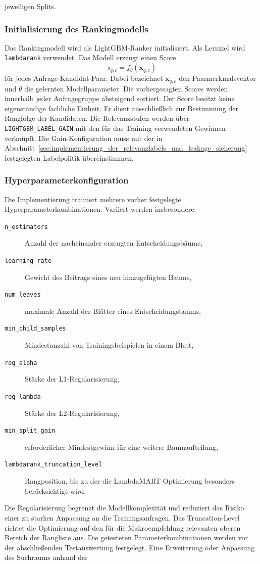 jeweiligen Splits. \subsubsection{Initialisierung des Rankingmodells} \label{subsubsec:initialisierung_rankingmodell} Das Rankingmodell wird als LightGBM-Ranker initialisiert. Als Lernziel wird \texttt{lambdarank} verwendet. Das Modell erzeugt einen Score \begin{equation} s_{q,c} = f_{\theta} \left( \boldsymbol{x}_{q,c} \right) \label{eq:lambdamart_score} \end{equation} für jedes Anfrage-Kandidat-Paar. Dabei bezeichnet $\boldsymbol{x}_{q,c}$ den Paarmerkmalsvektor und $\theta$ die gelernten Modellparameter. Die vorhergesagten Scores werden innerhalb jeder Anfragegruppe absteigend sortiert. Der Score besitzt keine eigenständige fachliche Einheit. Er dient ausschließlich zur Bestimmung der Rangfolge der Kandidaten. Die Relevanzstufen werden über \texttt{LIGHTGBM\_LABEL\_GAIN} mit den für das Training verwendeten Gewinnen verknüpft. Die Gain-Konfiguration muss mit der in Abschnitt~\ref{sec:implementierung_der_relevanzlabels_und_leakage_sicherung} festgelegten Labelpolitik übereinstimmen. \subsubsection{Hyperparameterkonfiguration} \label{subsubsec:hyperparameterkonfiguration_lambdamart} Die Implementierung trainiert mehrere vorher festgelegte Hyperparameterkombinationen. Variiert werden insbesondere: \begin{description} \item[\texttt{n\_estimators}] Anzahl der nacheinander erzeugten Entscheidungsbäume, \item[\texttt{learning\_rate}] Gewicht des Beitrags eines neu hinzugefügten Baums, \item[\texttt{num\_leaves}] maximale Anzahl der Blätter eines Entscheidungsbaums, \item[\texttt{min\_child\_samples}] Mindestanzahl von Trainingsbeispielen in einem Blatt, \item[\texttt{reg\_alpha}] Stärke der L1-Regularisierung, \item[\texttt{reg\_lambda}] Stärke der L2-Regularisierung, \item[\texttt{min\_split\_gain}] erforderlicher Mindestgewinn für eine weitere Baumaufteilung, \item[\texttt{lambdarank\_truncation\_level}] Rangposition, bis zu der die LambdaMART-Optimierung besonders berücksichtigt wird. \end{description} Die Regularisierung begrenzt die Modellkomplexität und reduziert das Risiko einer zu starken Anpassung an die Trainingsanfragen. Das Truncation-Level richtet die Optimierung auf den für die Makroempfehlung relevanten oberen Bereich der Rangliste aus. Die getesteten Parameterkombinationen werden vor der abschließenden Testauswertung festgelegt. Eine Erweiterung oder Anpassung des Suchraums anhand der 